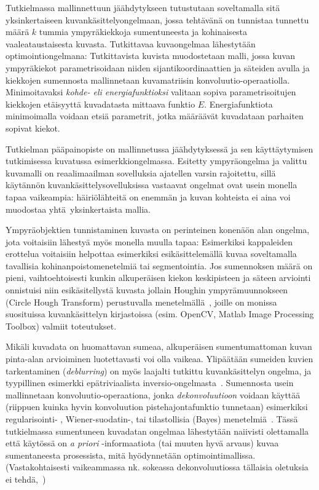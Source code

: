 Tutkielmassa mallinnettuun jäähdytykseen tutustutaan soveltamalla sitä yksinkertaiseen kuvankäsittelyongelmaan,
jossa tehtävänä on tunnistaa tunnettu määrä $k$ tummia ympyräkiekkoja sumentuneesta ja kohinaisesta vaaleataustaisesta kuvasta.
Tutkittavaa kuvaongelmaa lähestytään optimointiongelmana:
Tutkittavista kuvista muodostetaan malli, jossa kuvan ympyräkiekot parametrisoidaan niiden sijantikoordinaattien ja säteiden avulla
ja kiekkojen sumennosta mallinnetaan kuvamatriisin konvoluutio-operaatiolla.
Minimoitavaksi \emph{kohde- eli energiafunktioksi} valitaan sopiva parametrisoitujen kiekkojen etäisyyttä kuvadatasta mittaava funktio $E$.
Energiafunktiota minimoimalla voidaan etsiä parametrit, jotka määräävät kuvadataan parhaiten sopivat kiekot.

Tutkielman pääpainopiste on mallinnetussa jäähdytyksessä ja sen käyttäytymisen tutkimisessa kuvatussa esimerkkiongelmassa.
Esitetty ympyräongelma ja valittu kuvamalli on reaalimaailman sovelluksia ajatellen varsin rajoitettu,
sillä käytännön kuvankäsittelysovelluksissa vastaavat ongelmat ovat usein monella tapaa vaikeampia:
häiriölähteitä on enemmän ja kuvan kohteista ei aina voi muodostaa yhtä yksinkertaista mallia.

Ympyräobjektien tunnistaminen kuvasta on perinteinen konenäön alan ongelma,
jota voitaisiin lähestyä myös monella muulla tapaa:
Esimerkiksi kappaleiden erottelua voitaisiin helpottaa esimerkiksi esikäsittelemällä kuvaa soveltamalla tavallisia kohinanpoistomenetelmiä tai segmentointia.
Jos sumennoksen määrä on pieni, vaihtoehtoisesti kunkin alkuperäisen kiekon keskipisteen ja säteen arviointi onnistuisi niin esikäsitellystä kuvasta jollain Houghin ympyrämuunnokseen (Circle Hough Transform) perustuvalla menetelmällä~\cite[ks esim][]{leavers92},
joille on monissa suosituissa kuvankäsittelyn kirjastoissa (esim. OpenCV, Matlab Image Processing Toolbox) valmiit toteutukset.

Mikäli kuvadata on huomattavan sumeaa, alkuperäisen sumentumattoman kuvan pinta-alan arvioiminen luotettavasti voi olla vaikeaa.
Ylipäätään sumeiden kuvien tarkentaminen (\emph{deblurring}) on myös laajalti tutkittu kuvankäsittelyn ongelma,
ja tyypillinen esimerkki epätriviaalista inversio-ongelmasta~\cite{muellersiltanen12}.
Sumennosta usein mallinnetaan konvoluutio-operaationa, jonka \emph{dekonvoluutioon} voidaan käyttää (riippuen kuinka hyvin konvoluution pistehajontafunktio tunnetaan) esimerkiksi regu\-la\-ri\-sointi- \cite{muellersiltanen12}, Wiener-suodatin-, tai tilastollisia (Bayes) menetelmiä~\cite{chaudhuri14}.
Tässä tutkielmassa sumentuneen kuvadatan ongelmaa lähestytään naiivisti olettamalla että käytössä on \emph{a priori} -informaatiota (tai muuten hyvä arvaus) kuvaa sumentaneesta prosessista, mitä hyödynnetään optimointimallissa.
(Vastakohtaisesti vaikeammassa nk. sokeassa dekonvoluutiossa tällaisia oletuksia ei tehdä,~\cite[ks. esim][]{chaudhuri14})

